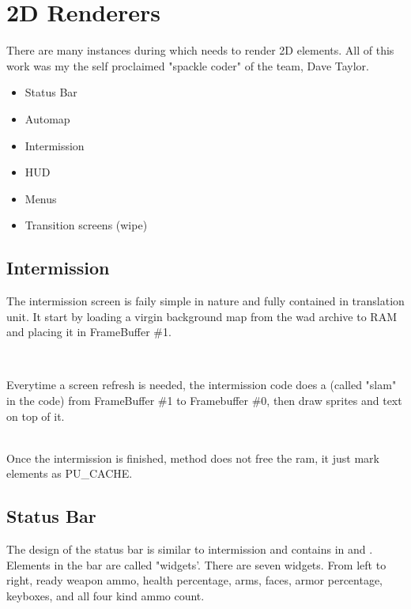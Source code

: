 \pagebreak
\section{2D Renderers}
There are many instances during which \doom needs to render 2D elements. All of this work was my the self proclaimed "spackle coder" of the team, Dave Taylor.\\
\begin{itemize}
\item Status Bar
\item Automap
\item Intermission
\item HUD
\item Menus
\item Transition screens (wipe)
\end{itemize} 
\par
{}



\subsection{Intermission}
The intermission screen is faily simple in nature and fully contained in  translation unit. It start by loading a virgin background map from the wad archive to RAM and placing it in FrameBuffer \#1.\\
\par
{}\\
\par
Everytime a screen refresh is needed, the intermission code does a  (called "slam" in the code) from FrameBuffer \#1 to Framebuffer \#0, then draw sprites and text on top of it.\\
\par
{}\\

Once the intermission is finished, method  does not free the ram, it just mark elements as PU\_CACHE.\\




\par

\subsection{Status Bar}
The design of the status bar is similar to intermission and contains in  and . Elements in the bar are called "widgets'. There are seven widgets. From left to right, ready weapon ammo, health percentage, arms, faces, armor percentage, keyboxes, and all four kind ammo count.\\
\par
{}
\par
{}\\

